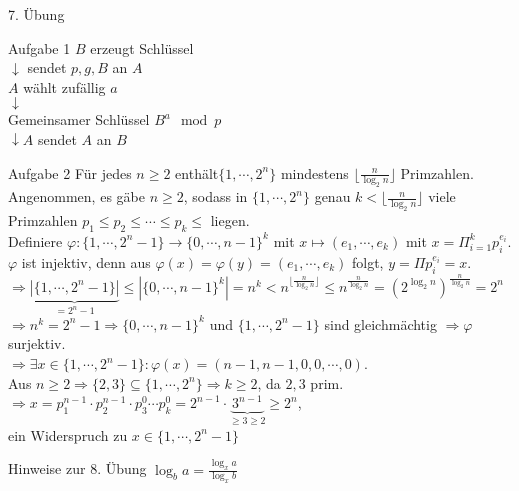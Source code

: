 \begin{section}{7. Übung}
 \begin{subsection}{Aufgabe 1}
   $B$ erzeugt Schlüssel\\
   $\downarrow$ sendet $p,g,B$ an $A$\\
   $A$ wählt zufällig $a$\\
   $\downarrow$\\
   Gemeinsamer Schlüssel $B^a \mod p$\\
   $\downarrow A$ sendet $A$ an $B$
 \end{subsection}
 \begin{subsection}{Aufgabe 2}
  Für jedes $n \geq 2$ enthält$\{1, \cdots, 2^n\}$ mindestens $\lfloor \frac{n}{\log_2 n} \rfloor$ Primzahlen.\\
  Angenommen, es gäbe $n \geq 2$, sodass in $\{1, \cdots, 2^n\}$ genau $k < \lfloor \frac{n}{\log_2 n} \rfloor$ viele Primzahlen $p_1 \leq p_2 \leq \cdots \leq p_k \leq$ liegen. \\
  Definiere $\varphi: \{1, \cdots, 2^n-1\} \rightarrow \{0, \cdots, n-1\}^k$ mit $x \mapsto (e_1, \cdots, e_k)$ mit $x = \Pi_{i=1}^k p_i^{e_i}$.\\
  $\varphi$ ist injektiv, denn aus $\varphi(x) = \varphi(y) = (e_1, \cdots, e_k)$ folgt, $y= \Pi p_i^{e_i}=x$.\\
  $\Rightarrow \underbrace{|\{1,\cdots, 2^n-1\}|}_{= 2^n-1} \leq |\{0,\cdots,n-1\}^k| = n^k < n^{\lfloor \frac{n}{\log_2 n}\rfloor} \leq n^{\frac{n}{\log_2 n}} = (2^{\log_2 n})^{\frac{n}{\log_2 n}} = 2^n$\\
  $\Rightarrow n^k = 2^n-1 \Rightarrow \{0,\cdots, n-1\}^k$ und $\{1, \cdots, 2^n-1\}$ sind gleichmächtig $\Rightarrow \varphi$ surjektiv.\\
  $\Rightarrow \exists x \in \{1,\cdots, 2^n-1\}: \varphi(x) = (n-1,n-1,0,0,\cdots,0)$.\\
  Aus $n\geq 2 \Rightarrow \{2,3\} \subseteq \{1,\cdots,2^n\} \Rightarrow k \geq 2$, da $2,3$ prim.\\
  $\Rightarrow x = p_1^{n-1} \cdot p_2^{n-1} \cdot p_3^0 \cdots p_k^0 = 2^{n-1} \cdot \underbrace{3^{n-1}}_{\geq 3 \geq 2} \geq 2^n$, \\
  ein Widerspruch zu $x \in \{1,\cdots,2^n-1\}$
 \end{subsection}
 \begin{subsection}{Hinweise zur 8. Übung}
  $\log_b a = \frac{\log_x a}{\log_x b}$
 \end{subsection}
\end{section}
